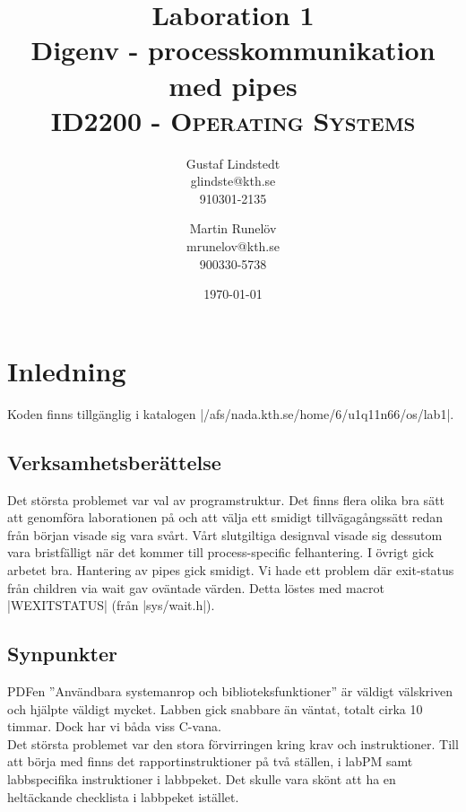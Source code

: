 \documentclass[paper=a4, fontsize=11pt]{scrartcl} %
\title{ 
\huge Laboration 1 \\ Digenv - processkommunikation med pipes \\ %
\vspace{10pt}
\normalfont \normalsize 
\textsc{ID2200 - Operating Systems } \\ [25pt] %
}
\author{Gustaf Lindstedt \\ glindste@kth.se \\ 910301-2135 \and Martin Runelöv \\ mrunelov@kth.se \\ 900330-5738}
\date{\vspace{8pt}\normalsize\today} %
\numberwithin{equation}{section} %
\numberwithin{figure}{section} %
\numberwithin{table}{section} %
\begin{document}
\maketitle

\section{Inledning}

Koden finns tillgänglig i katalogen |/afs/nada.kth.se/home/6/u1q11n66/os/lab1|.\\



\subsection{Verksamhetsberättelse}
Det största problemet var val av programstruktur. 
Det finns flera olika bra sätt att genomföra laborationen på och att välja ett smidigt tillvägagångssätt redan från början visade sig vara svårt. Vårt slutgiltiga designval visade sig dessutom vara bristfälligt när det kommer till process-specific felhantering. I övrigt gick arbetet bra. Hantering av pipes gick smidigt. Vi hade ett problem där exit-status från children via wait gav oväntade värden. Detta löstes med macrot |WEXITSTATUS| (från |sys/wait.h|).


\subsection{Synpunkter}
PDFen ''Användbara systemanrop och biblioteksfunktioner'' är väldigt välskriven och hjälpte väldigt mycket.
Labben gick snabbare än väntat, totalt cirka 10 timmar. Dock har vi båda viss C-vana.\\

Det största problemet var den stora förvirringen kring krav och instruktioner. 
Till att börja med finns det rapportinstruktioner på två ställen, i labPM samt labbspecifika instruktioner i labbpeket. 
Det skulle vara skönt att ha en heltäckande checklista i labbpeket istället. \\
\end{document}
